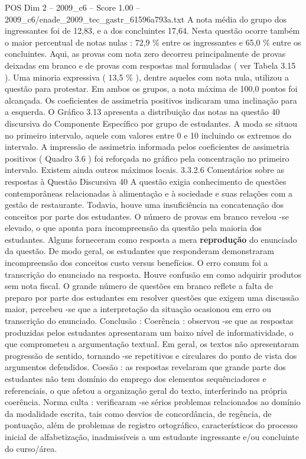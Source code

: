 \begin{textsample}{POS Dim 2 – 2009\_c6 – Score 1.00 – 2009\_c6/enade\_2009\_tec\_gastr\_61596a793a.txt}
A nota média do grupo dos ingressantes foi de 12,83, e a dos concluintes 17,64.
Nesta questão ocorre também o maior percentual de notas nulas : 72,9 \% entre os ingressantes e 65,0 \% entre os concluintes.
Aqui, as provas com nota zero decorreu principalmente de provas deixadas em branco e de provas com respostas mal formuladas ( ver Tabela 3.15 ).
Uma minoria expressiva ( 13,5 \% ), dentre aqueles com nota nula, utilizou a questão para protestar.
Em ambos os grupos, a nota máxima de 100,0 pontos foi alcançada.
Os coeficientes de assimetria positivos indicaram uma inclinação para a esquerda.
O Gráfico 3.13 apresenta a distribuição das notas na questão 40 discursiva do Componente Específico por grupo de estudantes.
A moda se situou no primeiro intervalo, aquele com valores entre 0 e 10 incluindo os extremos do intervalo.
A impressão de assimetria informada pelos coeficientes de assimetria positivos ( Quadro 3.6 ) foi reforçada no gráfico pela concentração no primeiro intervalo.
Existem ainda outros máximos locais. 3.3.2.6 Comentários sobre as respostas à Questão Discursiva 40 A questão exigia conhecimento de questões contemporâneas relacionadas à alimentação e à sociedade e suas relações com a gestão de restaurante.
Todavia, houve uma insuficiência na concatenação dos conceitos por parte dos estudantes.
O número de provas em branco revelou -se elevado, o que aponta para incompreensão da questão pela maioria dos estudantes.
Alguns forneceram como resposta a mera \textbf{reprodução} do enunciado da questão.
De modo geral, os estudantes que responderam demonstraram incompreensão dos conceitos custo versus benefícios.
O erro comum foi a transcrição do enunciado na resposta.
Houve confusão em como adquirir produtos sem nota fiscal.
O grande número de questões em branco reflete a falta de preparo por parte dos estudantes em resolver questões que exigem uma discussão maior, percebeu -se que a interpretação da situação ocasionou em erro ou transcrição do enunciado.
Conclusão : Coerência : observou -se que as respostas produzidas pelos estudantes apresentaram um baixo nível de informatividade, o que comprometeu a argumentação textual.
Em geral, os textos não apresentaram progressão de sentido, tornando -se repetitivos e circulares do ponto de vista dos argumentos defendidos.
Coesão : as respostas revelaram que grande parte dos estudantes não tem domínio do emprego dos elementos sequênciadores e referenciais, o que afetou a organização geral do texto, interferindo na própria coerência.
Norma culta : verificaram -se sérios problemas relacionados ao domínio da modalidade escrita, tais como desvios de concordância, de regência, de pontuação, além de problemas de registro ortográfico, característicos do processo inicial de alfabetização, inadmissíveis a um estudante ingressante e/ou concluinte do curso/área.

\end{textsample}
